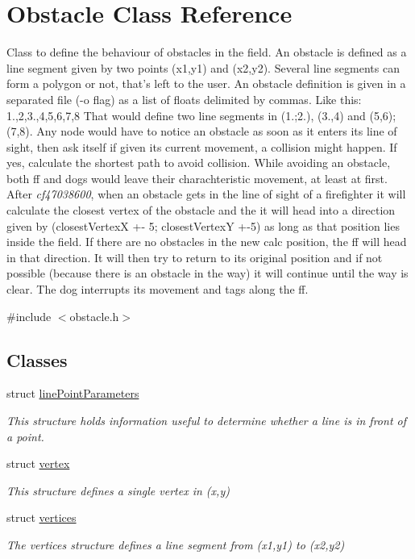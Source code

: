\hypertarget{class_obstacle}{\section{Obstacle Class Reference}
\label{class_obstacle}
}


Class to define the behaviour of obstacles in the field. An obstacle is defined as a line segment given by two points (x1,y1) and (x2,y2). Several line segments can form a polygon or not, that's left to the user. An obstacle definition is given in a separated file (-\/o flag) as a list of floats delimited by commas. Like this\-: 1.,2,3.,4,5,6,7,8 That would define two line segments in (1.;2.), (3.,4) and (5,6);(7,8). Any node would have to notice an obstacle as soon as it enters its line of sight, then ask itself if given its current movement, a collision might happen. If yes, calculate the shortest path to avoid collision. While avoiding an obstacle, both ff and dogs would leave their charachteristic movement, at least at first. After {\itshape cf47038600}, when an obstacle gets in the line of sight of a firefighter it will calculate the closest vertex of the obstacle and the it will head into a direction given by (closest\-Vertex\-X +-\/ 5; closest\-Vertex\-Y +-\/5) as long as that position lies inside the field. If there are no obstacles in the new calc position, the ff will head in that direction. It will then try to return to its original position and if not possible (because there is an obstacle in the way) it will continue until the way is clear. The dog interrupts its movement and tags along the ff.  




{\ttfamily \#include $<$obstacle.\-h$>$}

\subsection*{Classes}
\begin{DoxyCompactItemize}
\item 
struct \hyperlink{struct_obstacle_1_1line_point_parameters}{line\-Point\-Parameters}
\begin{DoxyCompactList}\small\item\em This structure holds information useful to determine whether a line is in front of a point. \end{DoxyCompactList}\item 
struct \hyperlink{struct_obstacle_1_1vertex}{vertex}
\begin{DoxyCompactList}\small\item\em This structure defines a single vertex in (x,y) \end{DoxyCompactList}\item 
struct \hyperlink{struct_obstacle_1_1vertices}{vertices}
\begin{DoxyCompactList}\small\item\em The vertices structure defines a line segment from (x1,y1) to (x2,y2) \end{DoxyCompactList}\end{DoxyCompactItemize}
